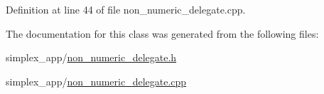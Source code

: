 Definition at line 44 of file non\+\_\+numeric\+\_\+delegate.\+cpp.



The documentation for this class was generated from the following files\+:\begin{DoxyCompactItemize}
\item 
simplex\+\_\+app/\hyperlink{non__numeric__delegate_8h}{non\+\_\+numeric\+\_\+delegate.\+h}\item 
simplex\+\_\+app/\hyperlink{non__numeric__delegate_8cpp}{non\+\_\+numeric\+\_\+delegate.\+cpp}\end{DoxyCompactItemize}
